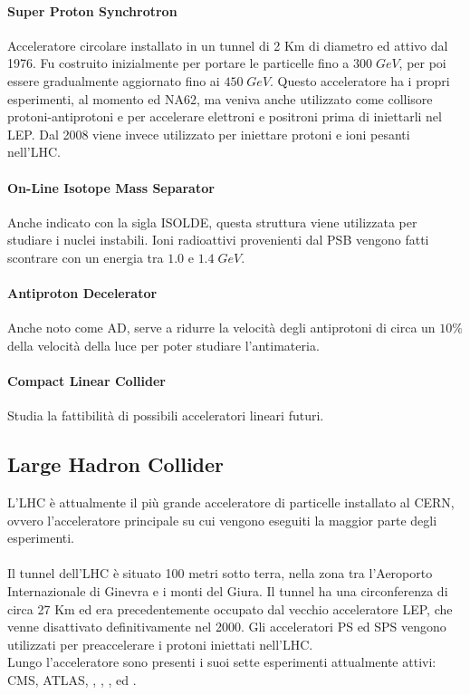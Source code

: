 		\paragraph{Super Proton Synchrotron}Acceleratore circolare installato in un tunnel di 2 Km di diametro ed attivo dal 1976. Fu costruito inizialmente per portare le particelle fino a $300 \; GeV$, per poi essere gradualmente aggiornato fino ai $450 \; GeV$. Questo acceleratore ha i propri esperimenti, al momento  ed NA62, ma veniva anche utilizzato come collisore protoni-antiprotoni e per accelerare elettroni e positroni prima di iniettarli nel \ac{LEP}. Dal 2008 viene invece utilizzato per iniettare protoni e ioni pesanti nell'\ac{LHC}.
		
		\paragraph{On-Line Isotope Mass Separator}Anche indicato con la sigla \acs{ISOLDE}, questa struttura viene utilizzata per studiare i nuclei instabili. Ioni radioattivi provenienti dal \ac{PSB} vengono fatti scontrare con un energia tra $1.0$ e $1.4 \; GeV$.
		
		\paragraph{Antiproton Decelerator}Anche noto come \acs{AD}, serve a ridurre la velocità degli antiprotoni di circa un $10\%$ della velocità della luce per poter studiare l'antimateria.
		
		\paragraph{Compact Linear Collider}Studia la fattibilità di possibili acceleratori lineari futuri.
		
		\subsection{Large Hadron Collider} \label{subsec:CERN;acceleratori;LHC}
			
			L'\ac{LHC} è attualmente il più grande acceleratore di particelle installato al \ac{CERN}, ovvero l'acceleratore principale su cui vengono eseguiti la maggior parte degli esperimenti.\\
			\\
			Il tunnel dell'\ac{LHC} è situato 100 metri sotto terra, nella zona tra l'Aeroporto Internazionale di Ginevra e i monti del Giura. Il tunnel ha una circonferenza di circa 27 Km ed era precedentemente occupato dal vecchio acceleratore \ac{LEP}, che venne disattivato definitivamente nel 2000. Gli acceleratori \ac{PS} ed \ac{SPS} vengono utilizzati per preaccelerare i protoni iniettati nell'\ac{LHC}.\\
			Lungo l'acceleratore sono presenti i suoi sette esperimenti attualmente attivi: \ac{CMS}, \ac{ATLAS}, , , ,  ed .\\
			
